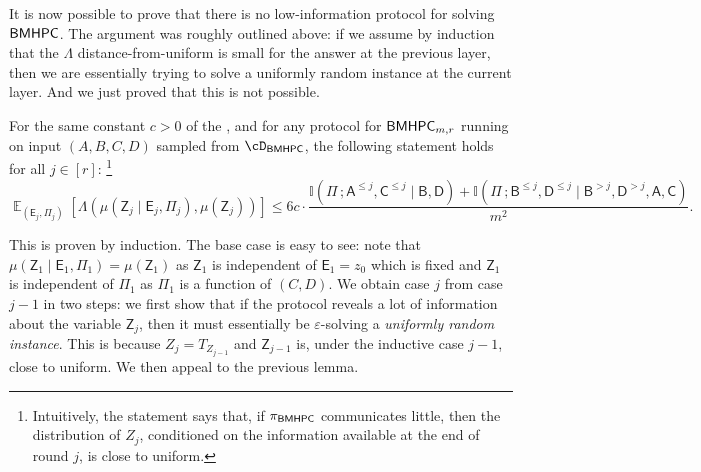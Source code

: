 \documentclass[11pt,letterpaper]{article}
\newcommand{\eps}{\varepsilon}
\DeclareMathOperator*{\E}{\mathbb{E}}
\renewcommand{\leq}{\leqslant}
\renewcommand{\le}{\leq}
\theoremstyle{definition}
\newcommand{\rPi}{\rv{\Pi}}
\newcommand{\bmhpc}{\ensuremath{\textnormal{\textsf{BMHPC}}}\xspace}
\newcommand{\rA}{\rv{A}}
\newcommand{\rB}{\rv{B}}
\newcommand{\rC}{\rv{C}}
\newcommand{\rD}{\rv{D}}
\newcommand{\rv}[1]{\ensuremath{\mathsf{#1}}}
\newcommand{\II}{\ensuremath{\mathbb{I}}}
\newcommand{\mi}[2]{\ensuremath{\II(#1 \,; #2)}}
\newcommand{\rZ}{\rv{Z}}
\newcommand{\rE}{\rv{E}}
\begin{document}
\bigskip\noindent
It is now possible to prove that there is no low-information protocol for solving $\bmhpc$. The argument was roughly outlined above: if we assume by induction that the $\Lambda$ distance-from-uniform is small for the answer at the previous layer, then we are essentially trying to solve a uniformly random instance at the current layer. And we just proved that this is not possible.

\begin{lemma}\label{lem:mhpc-dist}
For the same constant $c > 0$ of the , and for any protocol
for $\bmhpc_{m,r}$ running on input $(A, B, C, D)$ sampled from
$\cD_{\bmhpc}$, the following statement holds for all $j \in
[r]$:%
\footnote{Intuitively, the statement says that, if $\pi_\bmhpc$
communicates little, then the distribution of $Z_j$, conditioned on the
information available at the end of round $j$, is close to uniform.}
\[
  \E_{(\rE_j, \rPi_j)}\left[\Lambda(\mu(\rZ_j \mid \rE_j, \rPi_j), \mu(\rZ_j))\right]
  \leq 6 c \cdot \frac{\mi{\rPi}{\rA^{\le j},\rC^{\le j} \mid \rB,\rD} + \mi{\rPi}{\rB^{\le j},\rD^{\le j} \mid \rB^{> j}, \rD^{> j}, \rA,\rC}}{m^2}.
\] 

\end{lemma}





This is proven by induction. The base case is easy to see: note that $\mu(\rZ_1
\mid \rE_1, \rPi_1) = \mu(\rZ_1)$ as $\rZ_1$ is independent of $\rE_1 = z_0$
which is fixed and $\rZ_1$ is independent of $\rPi_1$ as $\Pi_1$ is a function
of $(C,D)$.
We obtain case $j$ from case $j - 1$ in two steps: we first show that if the
protocol reveals a lot of information about the variable $\rZ_{j}$, then it must
essentially be $\eps$-solving a \textit{uniformly random instance}. This is
because $Z_{j} = T_{Z_{j-1}}$ and $\rZ_{j-1}$ is, under the inductive case
$j-1$, close to uniform.
We then appeal to the previous lemma.
\end{document}
